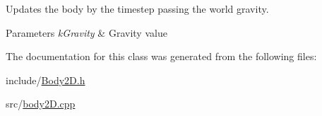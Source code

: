 Updates the body by the timestep passing the world gravity. 


\begin{DoxyParams}{Parameters}
{\em k\+Gravity} & Gravity value \\
\hline
\end{DoxyParams}


The documentation for this class was generated from the following files\+:\begin{DoxyCompactItemize}
\item 
include/\hyperlink{_body2_d_8h}{Body2\+D.\+h}\item 
src/\hyperlink{body2_d_8cpp}{body2\+D.\+cpp}\end{DoxyCompactItemize}

